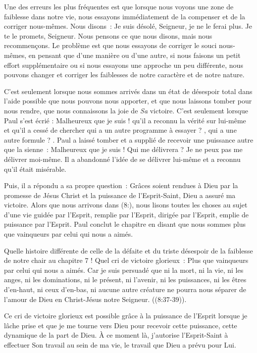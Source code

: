Une des erreurs les plus fréquentes est que lorsque nous voyons une zone
 de faiblesse dans notre vie, nous essayons immédiatement de la compenser
 et de la corriger nous-mêmes. Nous disons~:
 \og Je suis désolé, Seigneur, je ne le ferai plus.
 Je te le promets, Seigneur. \fg{}
 Nous pensons ce que nous disons, mais nous recommençons.
 Le problème est que nous essayons de corriger le souci nous-mêmes,
 en pensant que d'une manière ou d'une autre, si nous faisons un petit effort
 supplémentaire ou si nous essayons une approche un peu différente,
 nous pouvons changer et corriger les faiblesses de notre caractère
 et de notre nature.

C'est seulement lorsque nous sommes arrivés dans un état de désespoir total
 dans l'aide possible que nous pouvons nous apporter, et que nous laissons
 tomber pour nous rendre, que nous connaissons la joie de \emph{Sa} victoire.
 C'est seulement lorsque Paul s'est écrié :
 \og Malheureux que je suis ! \fg{} qu'il a reconnu la vérité sur lui-même
 et qu'il a cessé de chercher \og qui a un autre programme à essayer ? \fg{},
 \og qui a une autre formule ? \fg{}.
 Paul a laissé tomber et a supplié de recevoir une puissance
 autre que la sienne~: \og Malheureux que je suis ! Qui me délivrera ?
 Je ne peux pas me délivrer moi-même. \fg{}
 Il a abandonné l'idée de se délivrer lui-même et a reconnu
 qu'il était misérable.

Puis, il a répondu a sa propre question~:
 \og Grâces soient rendues à Dieu par la promesse de Jésus Christ
 et la puissance de l'Esprit-Saint, Dieu a assuré ma victoire. \fg{}
 Alors que nous arrivons dans (8:),
 nous lisons toutes les choses au sujet d'une vie guidée par l'Esprit,
 remplie par l'Esprit, dirigée par l'Esprit, emplie de puissance par l'Esprit.
 Paul conclut le chapitre en disant que nous sommes \og plus que vainqueurs
 par celui qui nous a aimés. \fg{}

Quelle histoire différente de celle de la défaite et du triste désespoir
 de la faiblesse de notre chair au chapitre 7 !
 Quel cri de victoire glorieux~:
 \og Plus que vainqueurs par celui qui nous a aimés.
 Car je suis persuadé que ni la mort, ni la vie, ni les anges,
 ni les dominations, ni le présent, ni l'avenir, ni les puissances,
 ni les êtres d'en-haut, ni ceux d'en-bas, ni aucune autre créature
 ne pourra nous séparer de l'amour de Dieu en Christ-Jésus
 notre Seigneur. \fg{} ((8:37-39)).

Ce cri de victoire glorieux est possible grâce à la puissance de l'Esprit
 lorsque je lâche prise et que je me tourne vers Dieu pour recevoir
 cette puissance, cette dynamique de la part de Dieu. À ce moment là,
 j'autorise l'Esprit-Saint à effectuer Son travail au sein de ma vie,
 le travail que Dieu a prévu pour Lui.

